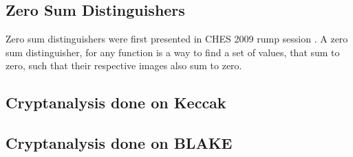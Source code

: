 \documentclass[12pt]{artikel3}                  %
\begin{document}


  \subsection{Zero Sum Distinguishers}
  Zero sum distinguishers were first presented in CHES 2009 rump session \cite{00014}. A zero sum distinguisher, for any
  function is a way to find a set of values, that sum to zero, such that their respective images also sum to zero.

  \subsection{Cryptanalysis done on Keccak}
  \subsection{Cryptanalysis done on BLAKE}
\end{document}
